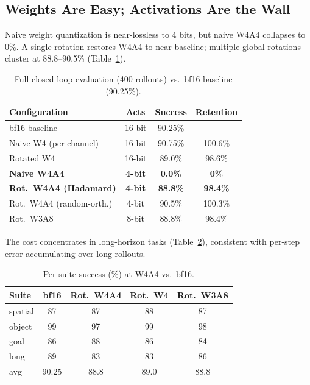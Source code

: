 \documentclass[conference]{IEEEtran}
\begin{document}
\subsection{Weights Are Easy; Activations Are the Wall}
\label{sec:wall}

Naive weight quantization is near-lossless to 4 bits, but naive W4A4 collapses to 0\%.
A single rotation restores W4A4 to near-baseline; multiple global rotations cluster at
88.8--90.5\% (Table~\ref{tab:main}).

\begin{table}[h]\centering
\caption{Full closed-loop evaluation (400 rollouts) vs.\ bf16 baseline (90.25\%).}
\label{tab:main}
\begin{tabular}{lccc}
\toprule
Configuration & Acts & Success & Retention \\
\midrule
bf16 baseline & 16-bit & 90.25\% & --- \\
Naive W4 (per-channel) & 16-bit & 90.75\% & 100.6\% \\
Rotated W4 & 16-bit & 89.0\% & 98.6\% \\
\textbf{Naive W4A4} & \textbf{4-bit} & \textbf{0.0\%} & \textbf{0\%} \\
\textbf{Rot.\ W4A4 (Hadamard)} & \textbf{4-bit} & \textbf{88.8\%} & \textbf{98.4\%} \\
Rot.\ W4A4 (random-orth.) & 4-bit & 90.5\% & 100.3\% \\
Rot.\ W3A8 & 8-bit & 88.8\% & 98.4\% \\
\bottomrule
\end{tabular}
\end{table}

The cost concentrates in long-horizon tasks (Table~\ref{tab:persuite}), consistent with
per-step error accumulating over long rollouts.

\begin{table}[h]\centering
\caption{Per-suite success (\%) at W4A4 vs.\ bf16.}
\label{tab:persuite}
\begin{tabular}{lcccc}
\toprule
Suite & bf16 & Rot.\ W4A4 & Rot.\ W4 & Rot.\ W3A8 \\
\midrule
spatial & 87 & 87 & 88 & 87 \\
object  & 99 & 97 & 99 & 98 \\
goal    & 86 & 88 & 86 & 84 \\
long    & 89 & 83 & 83 & 86 \\
\midrule
avg & 90.25 & 88.8 & 89.0 & 88.8 \\
\bottomrule
\end{tabular}
\end{table}
\end{document}
